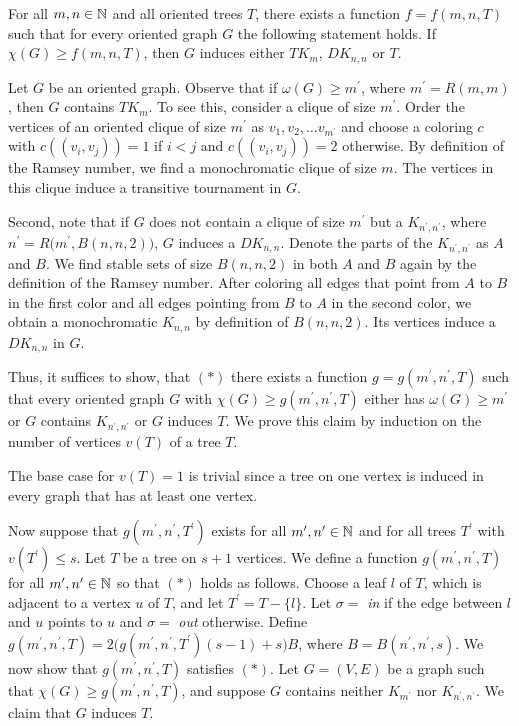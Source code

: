 \begin{thm}\label{t2cr}
For all $m,n\in\mathbb{N}$ and all oriented trees $T$, there exists a function $f=f(m,n,T)$ such that for every oriented graph $G$ the following statement holds. If $\chi (G)\geq f(m,n,T)$, then $G$ induces either $TK_m$, $DK_{n,n}$ or $T$.
\end{thm}

\begin{prf}
Let $G$ be an oriented graph. Observe that if $\omega (G)\geq m^\prime$, where $m^\prime = R(m,m)$, then $G$ contains $TK_m$. To see this, consider a clique of size $m^\prime$. Order the vertices of an oriented clique of size $m^\prime$ as $v_1,v_2,\dots v_{m^\prime}$ and choose a coloring $c$ with $c((v_i,v_j))=1$ if $i<j$ and $c((v_i, v_j))=2$ otherwise. By definition of the Ramsey number, we find a monochromatic clique of size $m$. The vertices in this clique induce a transitive tournament in $G$.

Second, note that if $G$ does not contain a clique of size $m^\prime$ but a $K_{n^\prime , n^\prime}$, where $n^\prime = R\big( m^\prime , B(n,n,2)\big)$, $G$ induces a $DK_{n,n}$. Denote the parts of the $K_{n^\prime , n^\prime}$ as $A$ and $B$. We find stable sets of size $B(n,n,2)$ in both $A$ and $B$ again by the definition of the Ramsey number. After coloring all edges that point from $A$ to $B$ in the first color and all edges pointing from $B$ to $A$ in the second color, we obtain a monochromatic $K_{n,n}$ by definition of $B(n,n,2)$. Its vertices induce a $DK_{n,n}$ in $G$. 

Thus, it suffices to show, that $(\ast)$ there exists a function $g=g(m^\prime ,n^\prime ,T)$ such that every oriented graph $G$ with $\chi (G)\geq g(m^\prime ,n^\prime ,T)$ either has $\omega (G)\geq m^\prime$ or $G$ contains $K_{n^\prime ,n^\prime }$ or $G$ induces $T$. We prove this claim by induction on the number of vertices $v(T)$ of a tree $T$. 

The base case for $v(T)=1$ is trivial since a tree on one vertex is induced in every graph that has at least one vertex. 

Now suppose that $g(m^\prime ,n^\prime ,T^\prime )$ exists for all $m^\prime ,n^\prime \in\mathbb{N}$ and for all trees $T^\prime$ with $v(T^\prime )\leq s$. Let $T$ be a tree on $s+1$ vertices. We define a function $g(m^\prime ,n^\prime ,T)$ for all $m^\prime ,n^\prime\in\mathbb{N}$ so that $(\ast)$ holds as follows. Choose a leaf $l$ of $T$, which is adjacent to a vertex $u$ of $T$, and let $T^\prime = T- \{l\}$. Let $\sigma =$ \textit{in} if the edge between $l$ and $u$ points to $u$ and $\sigma = $ \textit{out} otherwise. Define $g(m^\prime ,n^\prime ,T) = 2\big( g(m^\prime ,n^\prime ,T^\prime )(s-1)+s\big) B$, where $B=B(n^\prime ,n^\prime ,s)$. We now show that $g(m^\prime ,n^\prime ,T)$ satisfies $(\ast)$. Let $G=(V,E)$ be a graph such that $\chi (G)\geq g(m^\prime ,n^\prime ,T)$, and suppose $G$ contains neither $K_{m^\prime}$ nor $K_{n^\prime ,n^\prime}$. We claim that $G$ induces $T$.


\end{prf}
